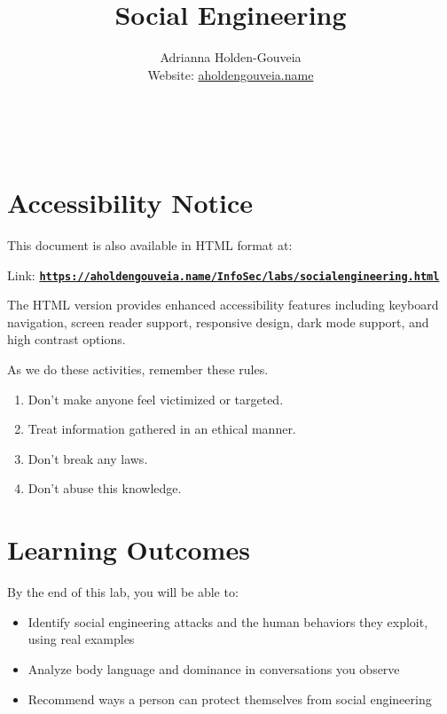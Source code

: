 \documentclass[12pt]{article}
\title{Social Engineering}
\author{
        Adrianna Holden-Gouveia \\
        Website: \href{https://aholdengouveia.name}{aholdengouveia.name}\\ 
        \date{\vspace{-5ex}}
        \faGithub {: aholdengouveia} \\
        \faTwitter {: aholdengouveia} \\
        }
\begin{document}
    

\maketitle

\section*{Accessibility Notice}
This document is also available in HTML format at:

Link: \href{https://aholdengouveia.name/InfoSec/labs/socialengineering.html}{\textbf{\nolinkurl{https://aholdengouveia.name/InfoSec/labs/socialengineering.html}}}

The HTML version provides enhanced accessibility features including keyboard navigation, screen reader support, responsive design, dark mode support, and high contrast options.



As we do these activities, remember these rules.
\begin{enumerate}
    \item Don't make anyone feel victimized or targeted.
    \item Treat information gathered in an ethical manner. 
    \item Don't break any laws. 
    \item Don't abuse this knowledge. 
\end{enumerate}

    
    


\section*{Learning Outcomes}
By the end of this lab, you will be able to:
\begin{itemize}
    \item Identify social engineering attacks and the human behaviors they exploit, using real examples
    \item Analyze body language and dominance in conversations you observe
    \item Recommend ways a person can protect themselves from social engineering
\end{itemize}
\end{document}
